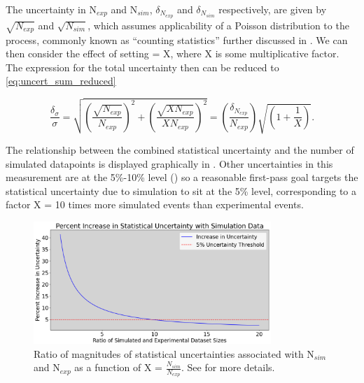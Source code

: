 
    The uncertainty in N$_{exp}$ and N$_{sim}$, $\delta_{N_{exp}}$ and $\delta_{N_{sim}}$ respectively, are given by $\sqrt{N_{exp}}$ and $\sqrt{N_{sim}}$, which assumes applicability of a Poisson distribution to the process, commonly known as ``counting statistics'' further discussed in \parencite{Knoll2000RadiationMeasurement}. We can then consider the effect of setting \Nsim = X\Nexp, where X is some multiplicative factor. The expression for the total uncertainty then can be reduced to \eqref{eq:uncert_sum_reduced}

        \begin{equation}\label{eq:uncert_sum_reduced}
               {\frac{\delta_{\sigma}}{\sigma} = \sqrt{ \left( \frac{ \sqrt{ N_{exp}} } { N_{exp}} \right)^2  +  \left( \frac{ \sqrt{ X N_{exp}} } { X N_{exp}} \right)^2     } =  \left(\frac{\delta_{N_{exp}}}{N_{exp}} \right) \sqrt{ \left(1+\frac{1}{X} \right)}}.
        \end{equation} 

    The relationship between the combined statistical uncertainty and the number of simulated datapoints is displayed graphically in . Other uncertainties in this measurement are at the 5\%-10\% level () so a reasonable first-pass goal targets the statistical uncertainty due to simulation to sit at the 5\% level, corresponding to a factor X = 10 times more simulated events than experimental events. 
    
    \begin{figure}[htb]
        \centering
        \includegraphics[width=0.8\textwidth]{Chapters/Ch3-Simulations/overview/pics/uncertainty_increase_rectangle.png}
        \caption[Comparison between Experimental and Statistical Uncertainties]{Ratio of magnitudes of statistical uncertainties associated with N$_{sim}$ and N$_{exp}$ as a function of X = $\frac{N_{sim}}{N_{exp}}$. See  for more details.}
        \label{fig:simulation_stats_increase}
    \end{figure}

